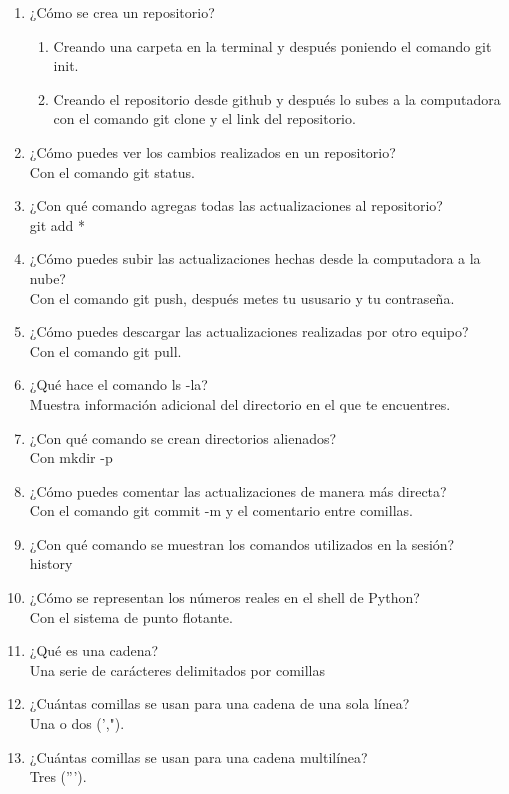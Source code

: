 \documentclass[letterpaper, 12pt, oneside]{article} %
\begin{document}
\begin{enumerate}
		\item ¿Cómo se crea un repositorio?
		\begin{enumerate}
			\item Creando una carpeta en la terminal y después poniendo el comando git init.
			\item Creando el repositorio desde github y después lo subes a la computadora con el comando git clone y el link del repositorio. 
		\end{enumerate}
		\item ¿Cómo puedes ver los cambios realizados en un repositorio?\\Con el comando git status.
		\item ¿Con qué comando agregas todas las actualizaciones al repositorio?\\git add *
		\item ¿Cómo puedes subir las actualizaciones hechas desde la computadora a la nube?\\Con el comando git push, después metes tu ususario y tu contraseña.
		\item ¿Cómo puedes descargar las actualizaciones realizadas por otro equipo?\\Con el comando git pull.
		\item ¿Qué hace el comando ls -la?\\Muestra información adicional del directorio en el que te encuentres.
		\item ¿Con qué comando se crean directorios alienados?\\Con mkdir -p
		\item ¿Cómo puedes comentar las actualizaciones de manera más directa?\\Con el comando git commit -m y el comentario entre comillas.
		\item ¿Con qué comando se muestran los comandos utilizados en la sesión?\\history
		\item ¿Cómo se representan los números reales en el shell de Python?\\Con el sistema de punto flotante.
		\item ¿Qué es una cadena?\\Una serie de carácteres delimitados por comillas
		\item ¿Cuántas comillas se usan para una cadena de una sola línea?\\Una o dos (',").
		\item ¿Cuántas comillas se usan para una cadena multilínea?\\Tres (''').

\end{enumerate}
\end{document}
